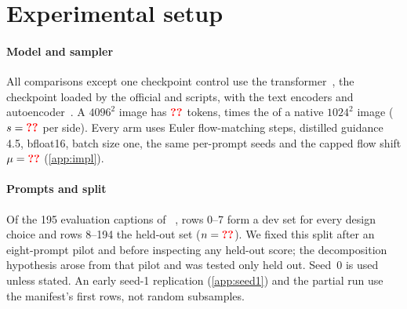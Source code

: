 \section{Experimental setup}\label{sec:protocol}

\begin{table}[t]
\centering
\caption{\textbf{Held-out results and decomposition.} Means over rows 8--194 (seed 0, $n=\N{ho@nprompts}$); bold marks the best mean and underline the second, which alone imply no significant difference. \better/\worse{} mark paired 95\% intervals against \segaofficial{} (shaded) that exclude zero, and $^{*}$ a Holm-adjusted $p\le0.05$; \dype{} (gray) is context. The bottom block gives paired gains (base\,+\,temp.: \tempsb{} $-$ \ntk; allocation: \segaofficial{} $-$ \tempsb), which \cref{tab:strengthen-factorial} splits further; \cref{tab:main,tab:share,tab:means_full,tab:deltas_full} expand this table. Key result: \tempsb{} ties \segaofficial{} on all three reward models and crop MUSIQ, and the allocation adds only full-frame MUSIQ and CLIP-IQA.}
\label{tab:results}
\footnotesize
\setlength{\tabcolsep}{3.4pt}

\end{table}

\paragraph{Model and sampler}
All comparisons except one checkpoint control use the \krea{} transformer~\citep{flux1kreadev2025}, the checkpoint loaded by the official \dype{} and \sega{} scripts, with the \fluxdev{} text encoders and autoencoder~\citep{flux2024}. A $4096^2$ image has $\N{c@ntgt}$ tokens,  times the  of a native $1024^2$ image ($s=\N{c@s}$ per side). Every arm uses  Euler flow-matching steps, distilled guidance 4.5, bfloat16, batch size one, the same per-prompt seeds and the capped flow shift $\mu=\N{c@muofficial}$ (\cref{app:impl}).

\paragraph{Prompts and split}
Of the 195 evaluation captions of \afk{}~\citep{zhang2025diffusion4k}, rows 0--7 form a dev set for every design choice and rows 8--194 the held-out set ($n=\N{ho@nprompts}$). We fixed this split after an eight-prompt pilot and before inspecting any held-out score; the decomposition hypothesis arose from that pilot and was tested only held out. Seed~0 is used unless stated. An early seed-1 replication (\cref{app:seed1}) and the partial \constancy{} run use the manifest's first rows, not random subsamples.

